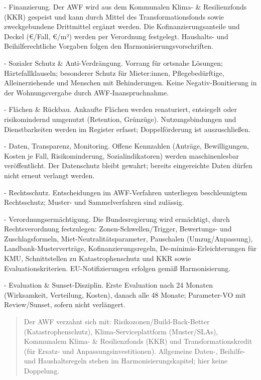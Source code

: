 \documentclass[12pt,a4paper]{scrartcl}
\begin{document}
- Finanzierung. Der AWF wird aus dem Kommunalen Klima- \& Resilienzfonds (KKR) gespeist und kann durch Mittel des Transformationsfonds sowie zweckgebundene Drittmittel ergänzt werden. Die Kofinanzierungsanteile und Deckel (€/Fall, €/m²) werden per Verordnung festgelegt. Haushalts- und Beihilferechtliche Vorgaben folgen den Harmonisierungsvorschriften.

- Sozialer Schutz \& Anti-Verdrängung. Vorrang für ortsnahe Lösungen; Härtefallklauseln; besonderer Schutz für Mieter:innen, Pflegebedürftige, Alleinerziehende und Menschen mit Behinderungen. Keine Negativ-Bonitierung in der Wohnungsvergabe durch AWF-Inanspruchnahme.

- Flächen \& Rückbau. Ankaufte Flächen werden renaturiert, entsiegelt oder risikomindernd umgenutzt (Retention, Grünzüge). Nutzungsbindungen und Dienstbarkeiten werden im Register erfasst; Doppelförderung ist auszuschließen.

- Daten, Transparenz, Monitoring. Offene Kennzahlen (Anträge, Bewilligungen, Kosten je Fall, Risikominderung, Sozialindikatoren) werden maschinenlesbar veröffentlicht. Der Datenschutz bleibt gewahrt; bereits eingereichte Daten dürfen nicht erneut verlangt werden.

- Rechtsschutz. Entscheidungen im AWF-Verfahren unterliegen beschleunigtem Rechtsschutz; Muster- und Sammelverfahren sind zulässig.

- Verordnungsermächtigung. Die Bundesregierung wird ermächtigt, durch Rechtsverordnung festzulegen: Zonen-Schwellen/Trigger, Bewertungs- und Zuschlagsformeln, Miet-Neutralitätsparameter, Pauschalen (Umzug/Anpassung), Landbank-Musterverträge, Kofinanzierungsregeln, De-minimis-Erleichterungen für KMU, Schnittstellen zu Katastrophenschutz und KKR sowie Evaluationskriterien. EU-Notifizierungen erfolgen gemäß Harmonisierung.

- Evaluation \& Sunset-Disziplin. Erste Evaluation nach 24 Monaten (Wirksamkeit, Verteilung, Kosten), danach alle 48 Monate; Parameter-VO mit Review/Sunset, sofern nicht verlängert.

{\footnotesize\begin{quote}
Der AWF verzahnt sich mit: Risikozonen/Build-Back-Better (Katastrophenschutz), Klima-Serviceplattform (Muster/SLAs), Kommunalem Klima- \& Resilienzfonds (KKR) und Transformationskredit (für Ersatz- und Anpassungsinvestitionen). Allgemeine Daten-, Beihilfe- und Haushaltsregeln stehen im Harmonisierungskapitel; hier keine Doppelung.
\end{quote}}
\end{document}

